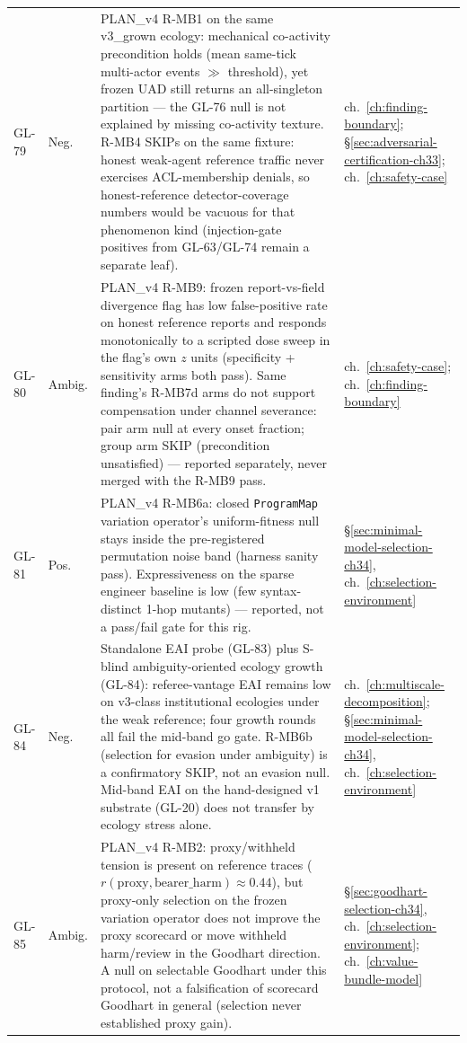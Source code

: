 \begin{longtable}{@{}L{0.05\textwidth}L{0.08\textwidth}L{0.55\textwidth}L{0.255\textwidth}@{}}
\label{finding:gl-79}GL-79 & Neg. & PLAN\_v4 R-MB1 on the same v3\_grown ecology: mechanical co-activity precondition holds (mean same-tick multi-actor events $\gg$ threshold), yet frozen UAD still returns an all-singleton partition --- the GL-76 null is not explained by missing co-activity texture. R-MB4 SKIPs on the same fixture: honest weak-agent reference traffic never exercises ACL-membership denials, so honest-reference detector-coverage numbers would be vacuous for that phenomenon kind (injection-gate positives from GL-63/GL-74 remain a separate leaf). & ch.~\ref{ch:finding-boundary}; \S\ref{sec:adversarial-certification-ch33}; ch.~\ref{ch:safety-case} \\
\label{finding:gl-80}GL-80 & Ambig. & PLAN\_v4 R-MB9: frozen report-vs-field divergence flag has low false-positive rate on honest reference reports and responds monotonically to a scripted dose sweep in the flag's own $z$ units (specificity + sensitivity arms both pass). Same finding's R-MB7d arms do not support compensation under channel severance: pair arm null at every onset fraction; group arm SKIP (precondition unsatisfied) --- reported separately, never merged with the R-MB9 pass. & ch.~\ref{ch:safety-case}; ch.~\ref{ch:finding-boundary} \\
\label{finding:gl-81}GL-81 & Pos. & PLAN\_v4 R-MB6a: closed \texttt{ProgramMap} variation operator's uniform-fitness null stays inside the pre-registered permutation noise band (harness sanity pass). Expressiveness on the sparse engineer baseline is low (few syntax-distinct 1-hop mutants) --- reported, not a pass/fail gate for this rig. & \S\ref{sec:minimal-model-selection-ch34}, ch.~\ref{ch:selection-environment} \\
\label{finding:gl-84}GL-84 & Neg. & Standalone EAI probe (GL-83) plus S-blind ambiguity-oriented ecology growth (GL-84): referee-vantage EAI remains low on v3-class institutional ecologies under the weak reference; four growth rounds all fail the mid-band go gate. R-MB6b (selection for evasion under ambiguity) is a confirmatory SKIP, not an evasion null. Mid-band EAI on the hand-designed v1 substrate (GL-20) does not transfer by ecology stress alone. & ch.~\ref{ch:multiscale-decomposition}; \S\ref{sec:minimal-model-selection-ch34}, ch.~\ref{ch:selection-environment} \\
\label{finding:gl-85}GL-85 & Ambig. & PLAN\_v4 R-MB2: proxy/withheld tension is present on reference traces ($r(\mathrm{proxy},\mathrm{bearer\_harm})\approx 0.44$), but proxy-only selection on the frozen variation operator does not improve the proxy scorecard or move withheld harm/review in the Goodhart direction. A null on selectable Goodhart under this protocol, not a falsification of scorecard Goodhart in general (selection never established proxy gain). & \S\ref{sec:goodhart-selection-ch34}, ch.~\ref{ch:selection-environment}; ch.~\ref{ch:value-bundle-model} \\

\end{longtable}

